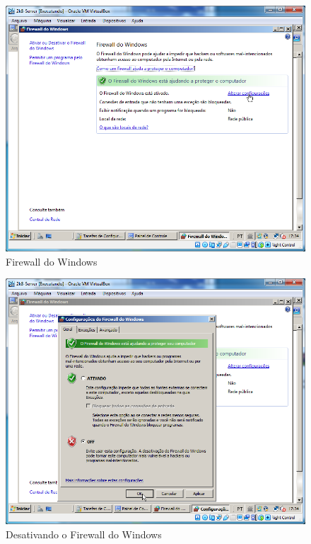 \documentclass[10pt]{article}
\begin{document}
\begin{figure}[H]
    \centering
    \caption{Firewall do Windows}
    \label{fig:4213}
    \includegraphics[width=\linewidth]{images/configuracao_windows/windows_server/003.png}
\end{figure}
\begin{figure}[H]
    \centering
    \caption{Desativando o Firewall do Windows}
    \label{fig:4214}
    \includegraphics[width=\linewidth]{images/configuracao_windows/windows_server/005.png}
\end{figure}
\end{document}
